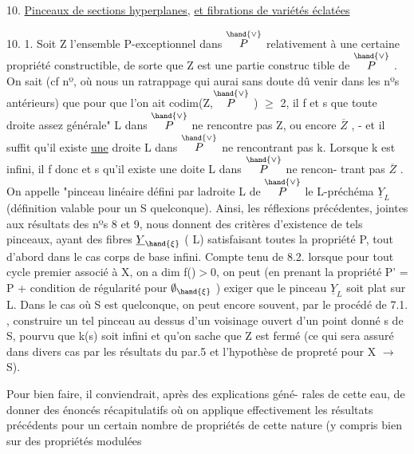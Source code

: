 
10. \uline{Pinceaux de sections hyperplanes}, \uline{et fibrations de variétés éclatées}

10. 1. Soit Z l'ensemble P-exceptionnel dans $\overset{\hand{\vee}}{P}$ relativement à une
certaine propriété constructible, de sorte que Z est une partie construc%
tible de $\overset{\hand{\vee}}{P}$ . \hand{(}\hand{)} On sait (cf nº, où nous  un ratrappage
 qui aurai sans doute dû venir dans les nºs antérieurs) que pour que
l'on ait codim(Z,$\overset{\hand{\vee}}{P}$ ) $\geqslant$ 2, il f et s que toute droite assez
générale" L dans $\overset{\hand{\vee}}{P}$ ne rencontre pas Z,  ou encore $\overline{Z}$ , - et il suffit
qu'il existe \uline{une} droite L dans $\overset{\hand{\vee}}{P}$ ne rencontrant pas k. Lorsque 
k est infini, il f donc et s qu'il existe une doite L dans $\overset{\hand{\vee}}{P}$ ne rencon-%
trant pas $\overline{Z}$ . On appelle "pinceau linéaire\hand{(}\hand{)} défini par ladroite
L de $\overset{\hand{\vee}}{P}$\hand{,} le L-préchéma $\underline{Y}_L$ (définition valable pour un S quelconque).
Ainsi, les réflexions précédentes, jointes aux résultats des nºs 8 et 9,
nous donnent des critères d'existence de tels pinceaux, ayant des fibres
$\underline{Y}_{\hand{\xi}}$ ( \hand{$\xi \in$}L) satisfaisant toutes la propriété P, tout d'abord dans le
cas  \hand{(}\hand{)} corps de base infini.  Compte tenu de
8.2.\hand{,} lorsque  pour tout cycle premier associé à X, on a dim f()$>$0,
on peut (en prenant la propriété P' = P + condition de régularité
pour $\emptyset_{\hand{\xi}}$ ) exiger que le pinceau $\underline{Y}_L$ soit plat sur L. Dans le cas
où S est quelconque, on peut encore souvent, par le procédé de 7.1. ,
construire un tel pinceau au dessus d'un voisinage ouvert d'un point
donné s de S, pourvu que k(s) soit infini et qu'on sache que Z est fermé
(ce qui sera assuré dans divers cas par les résultats du par.5 et
l'hypothèse de propreté pour X $\rightarrow$ S).

\margin{|} Pour bien faire, il conviendrait, après des explications géné-%
rales de cette eau, de donner des énoncés récapitulatifs où on
applique effectivement les résultats précédents pour un certain nombre
de propriétés de cette nature (y compris bien sur des propriétés modulées\hand{)}

